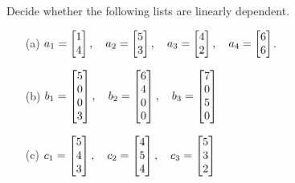 \documentclass[a4paper]{amsart}
\begin{document}
\begin{exercise}\label{ex-independent-i}
 Decide whether the following lists are linearly dependent.
 \begin{itemize}
  \item[(a)] $\displaystyle
              a_1=\left[\begin{matrix} 1\\4\end{matrix}\right],\quad 
              a_2=\left[\begin{matrix} 5\\3\end{matrix}\right],\quad 
              a_3=\left[\begin{matrix} 4\\2\end{matrix}\right],\quad 
              a_4=\left[\begin{matrix} 6\\6\end{matrix}\right]
             $.
  \item[(b)] $\displaystyle
              b_1=\left[\begin{matrix} 5\\0\\0\\3\end{matrix}\right],\quad
              b_2=\left[\begin{matrix} 6\\4\\0\\0\end{matrix}\right],\quad
              b_3=\left[\begin{matrix} 7\\0\\5\\0\end{matrix}\right]
             $
  \item[(c)] $\displaystyle
              c_1=\left[\begin{matrix} 5\\4\\3\end{matrix}\right],\quad
              c_2=\left[\begin{matrix} 4\\5\\4\end{matrix}\right],\quad
              c_3=\left[\begin{matrix} 5\\3\\2\end{matrix}\right]
             $
 \end{itemize}
\end{exercise}
\end{document}
